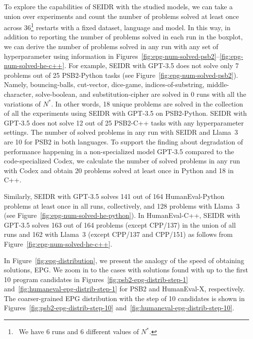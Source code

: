 To explore the capabilities of SEIDR with the studied models, we can take a union over experiments and count the number of problems solved at least once across 36\footnote{~We have 6 runs and 6 different values of $N^*.$} restarts with a fixed dataset, language and model.
In this way, in addition to reporting the number of problems solved in each run in the boxplot, we can derive the number of problems solved in any run with any set of hyperparameter using information in Figures~\ref{fig:epg-num-solved-psb2}--\ref{fig:epg-num-solved-he-c++}.
For example, SEIDR with GPT-3.5 does not solve only 7 problems out of 25 PSB2-Python tasks (see Figure~\ref{fig:epg-num-solved-psb2}).
Namely, bouncing-balls, cut-vector, dice-game, indices-of-substring, middle-character, solve-boolean, and substitution-cipher are solved in 0 runs with all the variations of $N^*$.
In other words, 18 unique problems are solved in the collection of all the experiments using SEIDR with GPT-3.5 on PSB2-Python. 
SEIDR with GPT-3.5 does not solve 12 out of 25 PSB2-C++ tasks with any hyperparameter settings. 
The number of solved problems in any run with SEIDR and Llama~3 are 10 for PSB2 in both languages. 
To support the finding about degradation of performance happening in a non-specialized model GPT-3.5 compared to the code-specialized Codex, we calculate the number of solved problems in any run with Codex and obtain 20 problems solved at least once in Python and 18 in C++. 

Similarly, SEIDR with GPT-3.5 solves 141 out of 164 HumanEval-Python problems at least once in all runs, collectively, and 128 problems with Llama~3 (see Figure~\ref{fig:epg-num-solved-he-python}).
In HumanEval-C++, SEIDR with GPT-3.5 solves 163 out of 164 problems (except CPP/137) in the union of all runs and 162 with Llama~3 (except CPP/137 and CPP/151) as follows from Figure~\ref{fig:epg-num-solved-he-c++}.


In Figure~\ref{fig:epg-distribution}, we present the analogy of the speed of obtaining solutions, EPG. 
We zoom in to the cases with solutions found with up to the first 10 program candidates in Figures~\ref{fig:psb2-epg-distrib-step-1} and~\ref{fig:humaneval-epg-distrib-step-1} for PSB2 and HumanEval-X, respectively. 
The coarser-grained EPG distribution with the step of 10 candidates is shown in Figures~\ref{fig:psb2-epg-distrib-step-10} and~\ref{fig:humaneval-epg-distrib-step-10}. 


